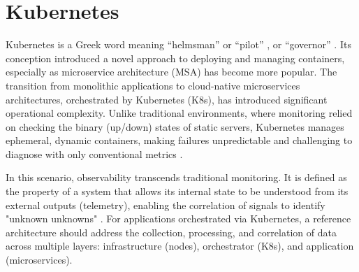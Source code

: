 \section{Kubernetes}
\label{sec:k8s}

Kubernetes is a Greek word meaning ``helmsman'' or ``pilot'' \cite{luksa_2018}, or ``governor'' \cite{santos_2019}. Its conception introduced a novel approach to deploying and managing containers, especially as microservice architecture (MSA) has become more popular. The transition from monolithic applications to cloud-native microservices architectures, orchestrated by Kubernetes (K8s), has introduced significant operational complexity. Unlike traditional environments, where monitoring relied on checking the binary (up/down) states of static servers, Kubernetes manages ephemeral, dynamic containers, making failures unpredictable and challenging to diagnose with only conventional metrics \cite{usman_2022}.

In this scenario, observability transcends traditional monitoring. It is defined as the property of a system that allows its internal state to be understood from its external outputs (telemetry), enabling the correlation of signals to identify "unknown unknowns" \cite{hausenblas_2023,creane_2022}. For applications orchestrated via Kubernetes, a reference architecture should address the collection, processing, and correlation of data across multiple layers: infrastructure (nodes), orchestrator (K8s), and application (microservices).











